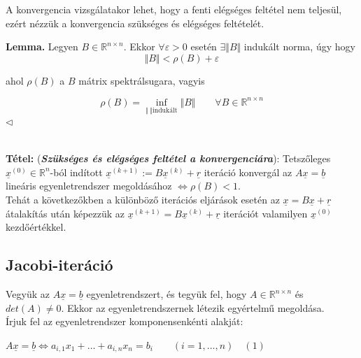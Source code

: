\documentclass[tikz,12pt,margin=0px]{article}
\begin{document}
    \noindent A konvergencia vizsgálatakor lehet, hogy a fenti elégséges feltétel nem teljesül, ezért nézzük a konvergencia szükséges és elégséges feltételét.\\

    {\footnotesize \noindent {\color{blue} \faLightbulbO\ $\triangleright$ } }
    {\footnotesize
    \noindent \textbf{Lemma.} Legyen $B \in \mathbb{R}^{n \times n}$. Ekkor $\forall \varepsilon > 0$ esetén $\exists \Vert B \Vert$ indukált norma, úgy hogy
    \[
        \Vert B \Vert < \rho(B) + \varepsilon
    \]

    \noindent ahol $\rho(B)$ a $B$ mátrix spektrálsugara, vagyis

    \[
        \rho(B) = \inf\limits_{\Vert \ \Vert \text{indukált}} \Vert B \Vert \qquad \forall B \in \mathbb{R}^{n \times n}
    \]
    \noindent $\triangleleft$ \faLightbulbO}\\

	\noindent \textbf{Tétel:} (\textbf{\emph{Szükséges és elégséges feltétel a konvergenciára}}):
    Tetszőleges $\underline{x}^{(0)} \in \mathbb{R}^{n}$-ból indított $\underline{x}^{(k+1)} := B\underline{x}^{(k)} + \underline{r}$ iteráció konvergál az $A\underline{x} = \underline{b}$ lineáris egyenletrendszer megoldásához $\Longleftrightarrow \rho(B) < 1$.\\

    \noindent Tehát a következőkben a különböző iterációs eljárások esetén az $\underline{x} = B\underline{x} + \underline{r}$ átalakítás után képezzük az $\underline{x}^{(k+1)} = B\underline{x}^{(k)} + \underline{r}$ iterációt valamilyen $\underline{x}^{(0)}$ kezdőértékkel.

	\subsection*{Jacobi-iteráció}
	
    \noindent Vegyük az $A\underline{x}=\underline{b}$ egyenletrendszert, és tegyük fel, hogy $A \in \mathbb{R}^{n \times n}$ és $det(A) \neq 0$. Ekkor az egyenletrendszernek létezik egyértelmű megoldása.\\

    \noindent Írjuk fel az egyenletrendszer komponensenkénti alakját:
    \begin{center}
        $A\underline{x}=\underline{b} \Leftrightarrow a_{i,1}x_1 + \ldots + a_{i,n}x_{n} = b_i\qquad (i = 1, \ldots, n) \quad (1)$
    \end{center}
\end{document}
